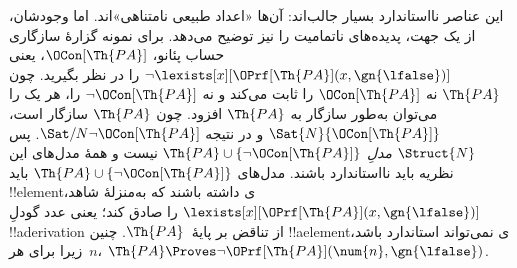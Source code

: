 \documentclass[../../../include/open-logic-section]{subfiles}
\begin{document}
این عناصر نااستاندارد بسیار جالب‌اند: آن‌ها «اعداد طبیعی نامتناهی»اند.
اما وجودشان، از یک جهت، پدیده‌های ناتمامیت را نیز توضیح می‌دهد. برای
نمونه گزارهٔ سازگاری حساب پئانو، $\OCon[\Th{PA}]$، یعنی
$\lnot \lexists[x][\OPrf[\Th{PA}](x, \gn{\lfalse})]$ را در نظر
بگیرید. چون $\Th{PA}$ نه $\OCon[\Th{PA}]$ را ثابت می‌کند و نه
$\lnot \OCon[\Th{PA}]$ را، هر یک را می‌توان به‌طور سازگار به
$\Th{PA}$ افزود. چون $\Th{PA}$ سازگار است،
$\Sat{N}{\OCon[\Th{PA}]}$ و در نتیجه
$\Sat/{N}{\lnot \OCon[\Th{PA}]}$. پس $\Struct{N}$
\emph{مدلِ} $\Th{PA} \cup \{\lnot \OCon[\Th{PA}]\}$ نیست و همهٔ
مدل‌های این نظریه باید نااستاندارد باشند. مدل‌های
$\Th{PA} \cup \{\lnot \OCon[\Th{PA}]\}$ باید !!{element}ی داشته
باشند که به‌منزلهٔ شاهد،
$\lexists[x][\OPrf[\Th{PA}](x, \gn{\lfalse})]$ را صادق کند؛ یعنی
عدد گودلِ !!a{derivation} از تناقض بر پایهٔ~$\Th{PA}$. چنین
!!a{element}ی نمی‌تواند استاندارد باشد، زیرا برای هر~$n$،
$\Th{PA} \Proves \lnot \OPrf[\Th{PA}](\num{n}, \gn{\lfalse})$.
\end{document}
